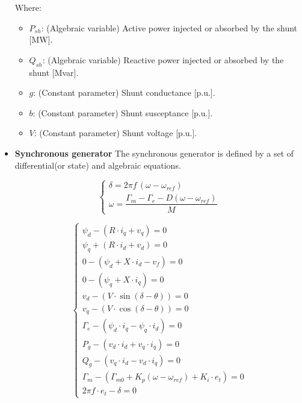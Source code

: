 \begin{itemize}
Where:
\begin{itemize}
  \item $P_{sh}$: (Algebraic variable) Active power injected or absorbed by the shunt [MW].
  \item $Q_{sh}$: (Algebraic variable) Reactive power injected or absorbed by the shunt [Mvar].
  \item $g$: (Constant parameter) Shunt conductance [p.u.].
  \item $b$: (Constant parameter) Shunt susceptance [p.u.].
  \item $V$: (Constant parameter) Shunt voltage [p.u.].
\end{itemize}

\item \textbf{Synchronous generator}
The synchronous generator is defined by a set of differential(or state) and algebraic equations. 


\begin{equation}
\begin{cases}
\delta = 2\pi f\,(\omega - \omega_{ref}) \\
\omega = \dfrac{\Gamma_m - \Gamma_e - D(\omega - \omega_{ref})}{M}
\end{cases}
\label{eq:diff_eq_gen}
\end{equation}

\begin{equation}
\begin{cases}
\psi_d - (R \cdot i_q + v_q) = 0 \\
\psi_q + (R\cdot i_d + v_d) = 0\\
0 - ( \psi_d + X \cdot i_d - v_f ) = 0\\
0 - (\psi_q + X \cdot i_q) = 0 \\
v_d - (V \cdot \sin(\delta - \theta)) = 0\\
v_q - (V \cdot \cos(\delta - \theta)) = 0\\
\Gamma_e - ( \psi_d \cdot i_q - \psi_q \cdot i_d ) = 0\\
P_g - (v_d \cdot i_d + v_q \cdot i_q) = 0\\
Q_g - (v_q \cdot i_d - v_d \cdot i_q) = 0 \\
\Gamma_m - (\Gamma_{m0} + K_p(\omega - \omega_{ref}) + K_i \cdot e_t) = 0\\
2\pi f \cdot e_t - \delta = 0
\end{cases}
\label{eq:alg_eq_gen}
\end{equation}


\end{itemize}
